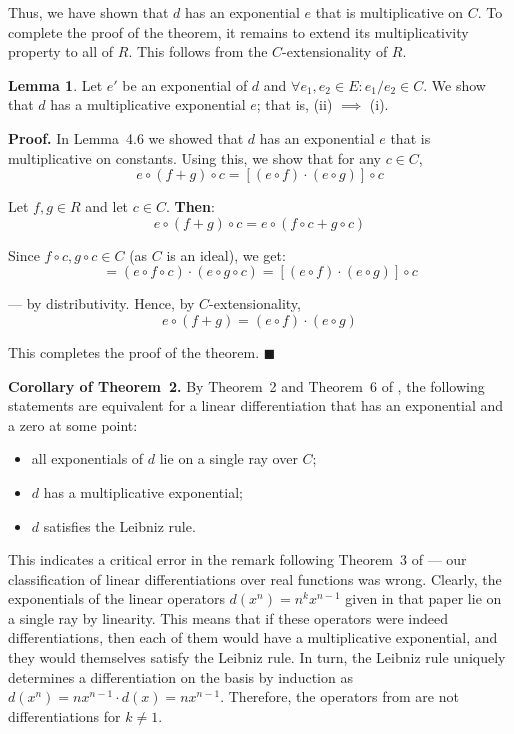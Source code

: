 \documentclass[12pt]{article}
\theoremstyle{definition}
\newtheorem{lemma}[definition]{Lemma}
\begin{document}
\vspace{15pt}
\noindent Thus, we have shown that \(d\) has an exponential \(e\) that is multiplicative on \(C\). 
To complete the proof of the theorem, it remains to extend its multiplicativity property to all of \(R\). 
This follows from the \(C\)-extensionality of \(R\).

\vspace{10pt}
\begin{lemma} Let \(e'\) be an exponential of \(d\) and \(\forall e_1, e_2 \in E \colon e_1 / e_2 \in C\).
We show that \(d\) has a multiplicative exponential \(e\); that is, (ii) \(\implies\) (i).

\vspace{10pt}
\textbf{Proof.} In Lemma~4.6 we showed that \(d\) has an exponential \(e\) that is multiplicative on constants. 
Using this, we show that for any \(c \in C\),
\[
e \circ (f + g) \circ c = [(e \circ f) \cdot (e \circ g)] \circ c
\]

Let $f, g \in R$ and let \(c \in C\). \textbf{Then}:
\[
e \circ (f + g) \circ c = e \circ (f \circ c + g \circ c)
\]

Since \(f \circ c, g \circ c \in C\) (as \(C\) is an ideal), we get:
\[
= (e \circ f \circ c) \cdot (e \circ g \circ c) = [(e \circ f) \cdot (e \circ g)] \circ c
\]

--- by distributivity. Hence, by \(C\)-extensionality,
\[
e \circ (f + g) = (e \circ f) \cdot (e \circ g)
\]

This completes the proof of the theorem. $\blacksquare$

\end{lemma}


\newpage
\noindent\textbf{Corollary of Theorem~2.}
By Theorem~2 and Theorem~6 of \cite{umerov2025}, the following statements are equivalent 
for a linear differentiation that has an exponential and a zero at some point:
\begin{itemize}
\item all exponentials of \(d\) lie on a single ray over \(C\);
\item \(d\) has a multiplicative exponential;
\item \(d\) satisfies the Leibniz rule.
\end{itemize}

This indicates a critical error in the remark following Theorem~3 of \cite{umerov2025} --- our classification 
of linear differentiations over real functions was wrong. Clearly, the exponentials of the linear operators \(d(x^n) = n^k x^{n-1}\) 
given in that paper lie on a single ray by linearity. This means that if these operators were indeed differentiations, 
then each of them would have a multiplicative exponential, and they would themselves satisfy the Leibniz rule. 
In turn, the Leibniz rule uniquely determines a differentiation on the basis 
by induction as \(d(x^n) = n x^{n-1} \cdot d(x) = n x^{n-1}\). 
Therefore, the operators from \cite{umerov2025} are not differentiations for \(k \neq 1\).
\end{document}
